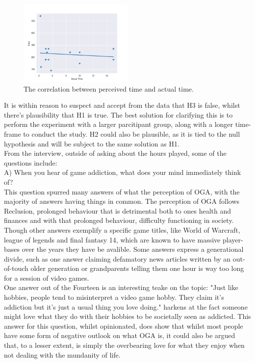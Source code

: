 \documentclass[conference]{IEEEtran}
\begin{document}
\begin{figure}[H]
\includegraphics[width = 0.5\textwidth]{Graph1}
\caption{The correlation between perceived time and actual time.}
\label{tab:figure5}
\end{figure}

It is within reason to suspect and accept from the data that H3 is false, whilst there's plausibility that H1 is true. The best solution for clarifying this is to perform the experiment with a larger parcitipant group, along with a longer time-frame to conduct the study. H2 could also be plausible, as it is tied to the null hypothesis and will be subject to the same solution as H1.\\

From the interview, outside of asking about the hours played, some of the questions include:\\

A) When you hear of game addiction, what does your mind immediately think of?\\

This question spurred many answers of what the perception of OGA, with the majority of answers having things in common. The perception of OGA follows Reclusion, prolonged behaviour that is detrimental both to ones health and finances and with that prolonged behaviour, difficulty functioning in society. Though other answers exemplify a specific game titles, like World of Warcraft, league of legends and final fantasy 14, which are known to have massive player-bases over the years they have be avalible. Some answers express a generational divide, such as one answer claiming defamatory news articles written by an out-of-touch older generation or grandparents telling them one hour is way too long for a session of video games.\\

One answer out of the Fourteen is an interesting teake on the topic: "Just like hobbies, people tend to misinterpret a video game hobby. They claim it's addiction but it's just a usual thing you love doing." harkens at the fact someone might love what they do with their hobbies to be societally seen as addicted. This answer for this question, whilst opinionated, does show that whilst most people have some form of negative outlook on what OGA is, it could also be argued that, to a lesser extent, is simply the overbearing love for what they enjoy when not dealing with the mundanity of life.\\
\end{document}
